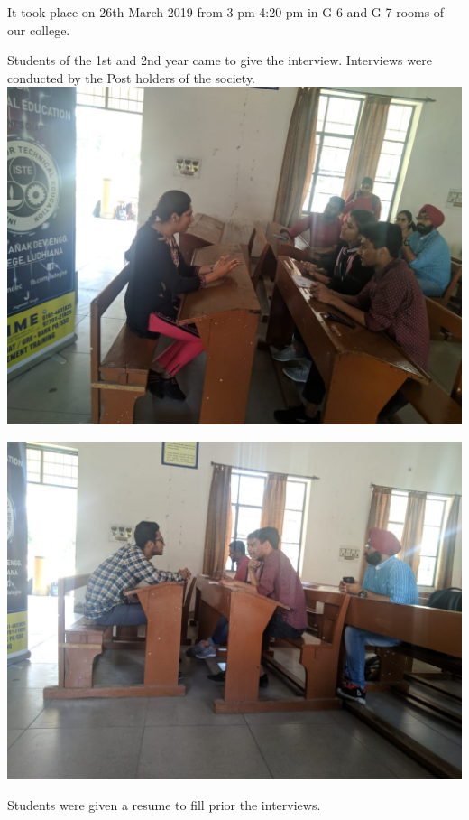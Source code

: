 \documentclass[12pt, a4 paper]{article}
\begin{document}
\begin{center}
\begin{Large}
\begin{multicols}{2}
\columnbreak
It took place on 26th March 2019 from 3 pm-4:20 pm in G-6 and G-7 rooms of our college.
\end{multicols}

\begin{multicols}{2}
Students of the 1st and 2nd year came to give the interview. Interviews were conducted by the Post holders of the society.
\columnbreak
\includegraphics[width=\linewidth]{image3.jpg}
  
\end{multicols}

\begin{multicols}{2}
\includegraphics[width=\linewidth]{image5.jpg}

\columnbreak
Students were given a resume to fill prior the interviews.
  

\end{multicols}
\end{Large}
\end{center}
\end{document}
